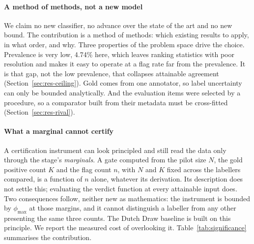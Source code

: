 \documentclass[review]{elsarticle}
\begin{document}
\paragraph{A method of methods, not a new model}
We claim no new classifier, no advance over the state of the art and no new
bound. The contribution is a method of methods: which existing results to apply,
in what order, and why. Three properties of the problem space drive the choice.
Prevalence is very low, 4.74\% here, which leaves ranking statistics with poor
resolution and makes it easy to operate at a flag rate far from the prevalence.
It is that gap, not the low prevalence, that collapses attainable agreement
(Section~\ref{sec:res-ceiling}). Gold comes from one annotator, so label uncertainty can only be bounded
analytically. And the evaluation items were selected by a procedure, so a
comparator built from their metadata must be cross-fitted
(Section~\ref{sec:res-rival}).

\paragraph{What a marginal cannot certify}
A certification instrument can look principled and still read the data only
through the stage's \emph{marginals}. A gate computed from the pilot size $N$,
the gold positive count $K$ and the flag count $n$, with $N$ and $K$ fixed across
the labellers compared, is a function of $n$ alone, whatever its derivation. Its
description does not settle this; evaluating the verdict function at every
attainable input does. Two consequences follow, neither new
as mathematics: the instrument is bounded by $\phi_{\max}$ at those margins, and
it cannot distinguish a labeller from any other presenting the same three counts.
The Dutch Draw baseline \cite{vandebijl2024dutchdraw,pries2023optimalbaseline} is
built on this principle. We report the measured cost of overlooking it.
Table~\ref{tab:significance} summarises the contribution.
\end{document}
